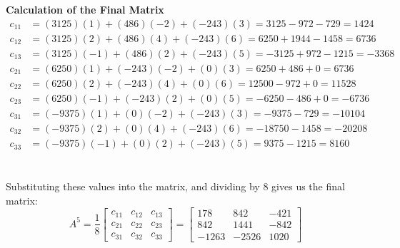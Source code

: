 \documentclass{article}
\begin{document}
\\
\\
\textbf{Calculation of the Final Matrix}
\\
\begin{align*}
	c_{11} & = (3125)(1) + (486)(-2) + (-243)(3) = 3125 - 972 - 729 = 1424    \\
	c_{12} & = (3125)(2) + (486)(4) + (-243)(6) = 6250 + 1944 - 1458 = 6736   \\
	c_{13} & = (3125)(-1) + (486)(2) + (-243)(5) = -3125 + 972 - 1215 = -3368 \\
	c_{21} & = (6250)(1) + (-243)(-2) + (0)(3) = 6250 + 486 + 0 = 6736        \\
	c_{22} & = (6250)(2) + (-243)(4) + (0)(6) = 12500 - 972 + 0 = 11528       \\
	c_{23} & = (6250)(-1) + (-243)(2) + (0)(5) = -6250 - 486 + 0 = -6736      \\
	c_{31} & = (-9375)(1) + (0)(-2) + (-243)(3) = -9375 - 729 = -10104        \\
	c_{32} & = (-9375)(2) + (0)(4) + (-243)(6) = -18750 - 1458 = -20208       \\
	c_{33} & = (-9375)(-1) + (0)(2) + (-243)(5) = 9375 - 1215 = 8160
\end{align*}
\\
\\
Substituting these values into the matrix, and dividing by $8$ gives us the
final matrix:
\[
	A^5 = \frac{1}{8}
	\begin{bmatrix}
		c_{11} & c_{12} & c_{13} \\
		c_{21} & c_{22} & c_{23} \\
		c_{31} & c_{32} & c_{33}
	\end{bmatrix}
	=
	\begin{bmatrix}
		178   & 842   & -421 \\
		842   & 1441  & -842 \\
		-1263 & -2526 & 1020
	\end{bmatrix}
\]

\pagebreak

\end{document}
